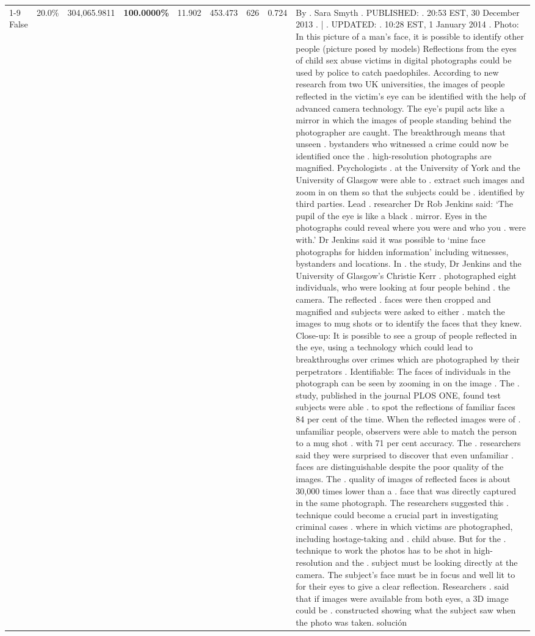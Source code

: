 \begin{table}[H]
\begin{tabular}{lllrlllll}
\cline{1-9}
False & 20.0\% & \color{red} 304,065.9811 & \bfseries \color{red} 100.0000\% & 11.902 & 453.473 & 626 & 0.724 & By . Sara Smyth . PUBLISHED: . 20:53 EST, 30 December 2013 . | . UPDATED: . 10:28 EST, 1 January 2014 . Photo: In this picture of a man's face, it is possible to identify other people (picture posed by models) Reflections from the eyes of child sex abuse victims in digital photographs could be used by police to catch paedophiles. According to new research from two UK universities, the images of people reflected in the victim's eye can be identified with the help of advanced camera technology. The eye's pupil acts like a mirror in which the images of people standing behind the photographer are caught. The breakthrough means that unseen . bystanders who witnessed a crime could now be identified once the . high-resolution photographs are magnified. Psychologists . at the University of York and the University of Glasgow were able to . extract such images and zoom in on them so that the subjects could be . identified by third parties. Lead . researcher Dr Rob Jenkins said: ‘The pupil of the eye is like a black . mirror. Eyes in the photographs could reveal where you were and who you . were with.' Dr Jenkins said it was possible to ‘mine face photographs for hidden information' including witnesses, bystanders and locations. In . the study, Dr Jenkins and the University of Glasgow's Christie Kerr . photographed eight individuals, who were looking at four people behind . the camera. The reflected . faces were then cropped and magnified and subjects were asked to either . match the images to mug shots or to identify the faces that they knew. Close-up: It is possible to see a group of people reflected in the eye, using a technology which could lead to breakthroughs over crimes which are photographed by their perpetrators . Identifiable: The faces of individuals in the photograph can be seen by zooming in on the image . The . study, published in the journal PLOS ONE, found test subjects were able . to spot the reflections of familiar faces 84 per cent of the time. When the reflected images were of . unfamiliar people, observers were able to match the person to a mug shot . with 71 per cent accuracy. The . researchers said they were surprised to discover that even unfamiliar . faces are distinguishable despite the poor quality of the images. The . quality of images of reflected faces is about 30,000 times lower than a . face that was directly captured in the same photograph. The researchers suggested this . technique could become a crucial part in investigating criminal cases . where in which victims are photographed, including hostage-taking and . child abuse. But for the . technique to work the photos has to be shot in high-resolution and the . subject must be looking directly at the camera. The subject's face must be in focus and well lit to for their eyes to give a clear reflection. Researchers . said that if images were available from both eyes, a 3D image could be . constructed showing what the subject saw when the photo was taken. solución \\

\end{tabular}
\end{table}
